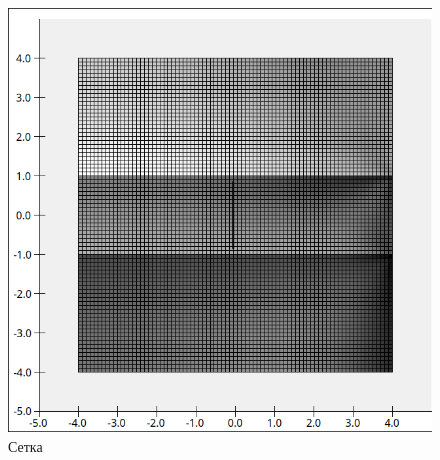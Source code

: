 \begin{figure}[h!]
	\centering
	\includegraphics[height=0.3\textheight]{pictures/grid.png}
	\caption{ Сетка
	}
	\label{fig:grid}
\end{figure}

